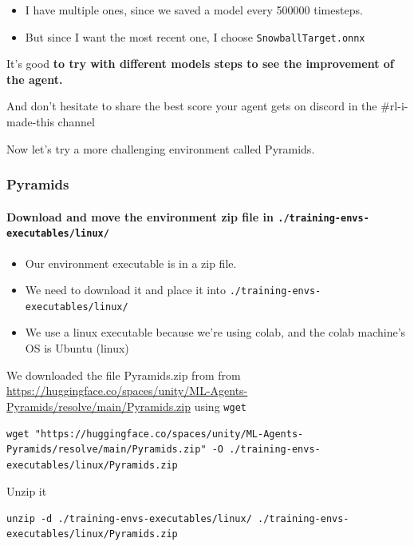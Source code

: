 \documentclass[11pt,a4paper]{article}
\begin{document}
\begin{itemize}
\tightlist
\item
  I have multiple ones, since we saved a model every 500000 timesteps.
\item
  But since I want the most recent one, I choose \texttt{SnowballTarget.onnx}
\end{itemize}

It's good \textbf{to try with different models steps to see the improvement of the agent.}

And don't hesitate to share the best score your agent gets on discord in the \#rl-i-made-this channel

Now let's try a more challenging environment called Pyramids.

\subsubsection{Pyramids}\label{pyramids}

\paragraph{\texorpdfstring{Download and move the environment zip file in \texttt{./training-envs-executables/linux/}}{Download and move the environment zip file in ./training-envs-executables/linux/}}\label{download-and-move-the-environment-zip-file-in-.training-envs-executableslinux-1}

\begin{itemize}
\tightlist
\item
  Our environment executable is in a zip file.
\item
  We need to download it and place it into \texttt{./training-envs-executables/linux/}
\item
  We use a linux executable because we're using colab, and the colab machine's OS is Ubuntu (linux)
\end{itemize}

We downloaded the file Pyramids.zip from from \url{https://huggingface.co/spaces/unity/ML-Agents-Pyramids/resolve/main/Pyramids.zip} using \texttt{wget}

\begin{lstlisting}
wget "https://huggingface.co/spaces/unity/ML-Agents-Pyramids/resolve/main/Pyramids.zip" -O ./training-envs-executables/linux/Pyramids.zip
\end{lstlisting}

Unzip it

\begin{lstlisting}
unzip -d ./training-envs-executables/linux/ ./training-envs-executables/linux/Pyramids.zip
\end{lstlisting}
\end{document}

